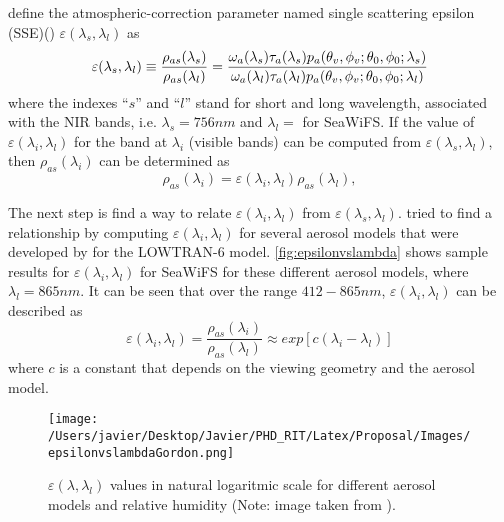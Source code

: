\cite{Gordon:1994} define the atmospheric-correction parameter named single scattering epsilon (SSE)(\cite{IOCCG:2010}) $\varepsilon(\lambda_s,\lambda_l)$ as
\begin{equation}\label{eq:espilon}
  \varepsilon(\lambda_s,\lambda_l) \equiv \frac{\rho_{as}(\lambda_s)}{\rho_{as}(\lambda_l)} = \\
  \frac{\omega_a(\lambda_s)\tau_a(\lambda_s)p_a(\theta_v,\phi_v;\theta_0,\phi_0;\lambda_s)}{\omega_a(\lambda_l)\tau_a(\lambda_l)p_a(\theta_v,\phi_v;\theta_0,\phi_0;\lambda_l)}
\end{equation}
where the indexes ``$s$'' and ``$l$'' stand for short and long wavelength, associated with the NIR bands, i.e. $\lambda_s=756nm$ and $\lambda_l=$ for SeaWiFS. If the value of $\varepsilon(\lambda_i,\lambda_l)$ for the band at $\lambda_i$ (visible bands) can be computed from $\varepsilon(\lambda_s,\lambda_l)$, then $\rho_{as}(\lambda_i)$ can be determined as
\begin{equation}\label{eq:rholambda_i}
  \rho_{as}(\lambda_i) = \varepsilon(\lambda_i,\lambda_l)\rho_{as}(\lambda_l),
\end{equation}

The next step is find a way to relate $\varepsilon(\lambda_i,\lambda_l)$ from $\varepsilon(\lambda_s,\lambda_l)$. \cite{Gordon:1994} tried to find a relationship by computing  $\varepsilon(\lambda_i,\lambda_l)$ for several aerosol models that were developed by \cite{Shettle:1979} for the LOWTRAN-6 model. \autoref{fig:epsilonvslambda} shows sample results for $\varepsilon(\lambda_i,\lambda_l)$ for SeaWiFS for these different aerosol models, where $\lambda_l=865nm$. It can be seen that over the range $412-865nm$, $\varepsilon(\lambda_i,\lambda_l)$ can be described as
\begin{equation}\label{eq:epsilonexp}
  \varepsilon(\lambda_i,\lambda_l) = \frac{\rho_{as}(\lambda_i)}{\rho_{as}(\lambda_l)} \approx exp[c(\lambda_i-\lambda_l)]
\end{equation}
where $c$ is a constant that depends on the viewing geometry and the aerosol model. 

\begin{figure}[!ht]
  \centering
  \texttt{[image: /Users/javier/Desktop/Javier/PHD\_RIT/Latex/Proposal/Images/epsilonvslambdaGordon.png]}
  \caption{$\varepsilon(\lambda,\lambda_l)$ values in natural logaritmic scale for different aerosol models and relative humidity (Note: image taken from \cite{Gordon:1997}). \label{fig:epsilonvslambda} } 
\end{figure}


